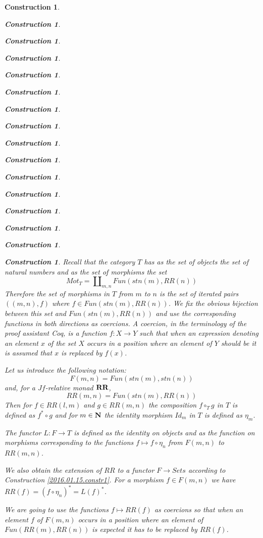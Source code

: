 \documentclass[12pt]{amsart}
\newtheorem{construction}[proposition]{Construction}
\newcommand{\sr}{\rightarrow}
\newcommand{\nn}{{\bf N\rm}}
\newcommand{\nat}{\nn}
\newcommand{\mbind}[1]{{#1^*}}
\newcommand{\hc}{\circ_{T}}
\newcommand{\RR}{{\bf RR}}
\begin{document}
\begin{construction}
\begin{construction}
\begin{construction}
\begin{construction}
\begin{construction}
\begin{construction}
\begin{construction}
\begin{construction}
\begin{construction}
\begin{construction}
\begin{construction}
\begin{construction}
\begin{construction}
\begin{construction}
\begin{construction}
\begin{construction}
Recall that the category $T$ has as the set of objects the set of natural numbers and as the set of morphisms the set 
%
$$Mot_T=\amalg_{m,n} Fun(stn(m),RR(n))$$
%
Therefore the set of morphisms in $T$ from $m$ to $n$ is the set of iterated pairs $((m,n),f)$ where $f\in Fun(stn(m),RR(n))$. We fix the obvious bijection between this set and $Fun(stn(m),RR(n))$ and use the corresponding functions in both directions as coercions. A coercion, in the terminology of the proof assistant Coq, is a function $f:X\sr Y$ such that when an expression denoting an element $x$ of the set $X$ occurs in a position where an element of $Y$ should be it is assumed that $x$ is replaced by $f(x)$.

Let us introduce the following notation:
%
$$F(m,n)=Fun(stn(m),stn(n))$$
%
and, for a $Jf$-relative monad $\RR$,
%
$$RR(m,n)=Fun(stn(m),RR(n))$$
%
Then for $f\in RR(l,m)$ and $g\in RR(m,n)$ the composition $f\hc g$ in $T$ is defined as $\mbind{f}\circ g$ and for $m\in\nat$ the identity morphism $Id_m$ in $T$ is defined as $\eta_{m}$. 

The functor $L:F\sr T$ is defined as the identity on objects and as the function on morphisms corresponding to the functions $f\mapsto f\circ \eta_{n}$ from $F(m,n)$ to $RR(m,n)$. 

We also obtain the extension of $RR$ to a functor $F\sr Sets$ according to Construction \ref{2016.01.15.constr1}. For a morphism $f\in F(m,n)$ we have $RR(f)=\mbind{(f\circ \eta_{n})}=\mbind{L(f)}$. 

We are going to use the functions $f\mapsto RR(f)$ as coercions so that when an element $f$ of $F(m,n)$ occurs in a position where an element of $Fun(RR(m),RR(n))$ is expected it has to be replaced by $RR(f)$. 


\end{construction}
\end{construction}
\end{construction}
\end{construction}
\end{construction}
\end{construction}
\end{construction}
\end{construction}
\end{construction}
\end{construction}
\end{construction}
\end{construction}
\end{construction}
\end{construction}
\end{construction}
\end{construction}
\end{document}
